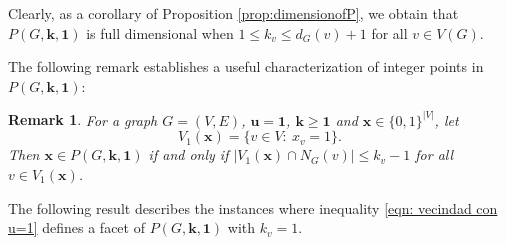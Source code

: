 \documentclass[preprint,12pt]{article}
\renewcommand{\leq}{\leqslant}
\renewcommand{\geq}{\geqslant}
\newtheorem{remark}[theorem]{Remark}
\theoremstyle{definition}
\begin{document}
Clearly, as a corollary of Proposition \ref{prop:dimensionofP}, we obtain that  $P(G,\mathbf{k},\mathbf{1})$ is full dimensional when $1\leq k_v\leq d_G(v)+1$ for all $v\in V(G)$.


 The following remark establishes a useful characterization of integer points in $P(G,\mathbf{k},\mathbf{1})$:

\begin{remark}\label{rem:V1}
   For a graph $G=(V,E)$, $\mathbf{u}=\mathbf{1}$, $\mathbf{k}\geq \mathbf{1}$ and  $\mathbf{x}\in \{0,1\}^{|V|}$, let $$V_1(\mathbf{x})=\{v\in V:\ x_v=1\}.$$ Then $\mathbf{x}\in P(G,\mathbf{k},\mathbf{1})$ if and only if $|V_1(\mathbf{x})\cap N_G(v)|\leq k_v-1$ for all $v\in V_1(\mathbf{x})$.
\end{remark}




The following result describes the instances where inequality \eqref{eqn: vecindad con u=1} defines a facet of $P(G,\mathbf{k},\mathbf{1})$ with $k_v=1$.
\end{document}
